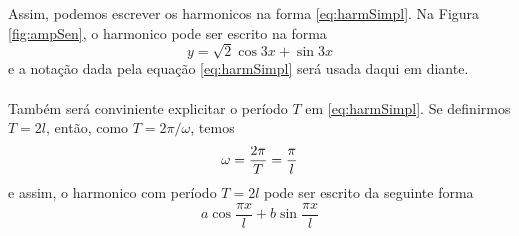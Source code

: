 Assim, podemos escrever os harmonicos na forma \ref{eq:harmSimpl}. Na Figura \ref{fig:ampSen},
o harmonico pode ser escrito na forma\\
\begin{equation}
    y = \sqrt{2}\cos{3x}+\sin{3x}
\end{equation} 
e a notação dada pela equação \ref{eq:harmSimpl} será usada daqui em diante.\\
\\
Também será conviniente explicitar o período $T$ em \ref{eq:harmSimpl}. Se definirmos
$T = 2l$, então, como $T = 2\pi/\omega$, temos
\begin{equation}
    \notag
    \omega = \dfrac{2\pi}{T}=\dfrac{\pi}{l}
\end{equation}
e assim, o harmonico com período $T=2l$ pode ser escrito da seguinte forma\\
\begin{equation}
    a\cos{\dfrac{\pi x}{l}} + b\sin{\dfrac{\pi x}{l}}
\end{equation}